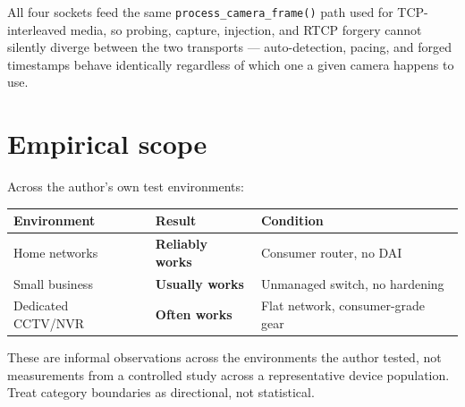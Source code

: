\documentclass[11pt,a4paper]{article}
\newcommand{\code}[1]{\texttt{\small #1}}
\begin{document}
All four sockets feed the same \code{process\_camera\_frame()} path used for TCP-interleaved media, so probing, capture, injection, and RTCP forgery cannot silently diverge between the two transports --- auto-detection, pacing, and forged timestamps behave identically regardless of which one a given camera happens to use.

\section{Empirical scope}
Across the author's own test environments:

\begin{center}
\small
\begin{tabular}{@{}p{3.4cm}p{3.1cm}p{5.0cm}@{}}
\toprule
\textbf{Environment} & \textbf{Result} & \textbf{Condition} \\
\midrule
Home networks & \textcolor{redc}{\bfseries Reliably works} & Consumer router, no DAI \\
Small business & \textcolor{accentink}{\bfseries Usually works} & Unmanaged switch, no hardening \\
Dedicated CCTV/NVR & \textcolor{accentink}{\bfseries Often works} & Flat network, consumer-grade gear \\
\bottomrule
\end{tabular}
\end{center}

\begin{notebox}
These are informal observations across the environments the author tested, not measurements from a controlled study across a representative device population. Treat category boundaries as directional, not statistical.
\end{notebox}

\end{document}
